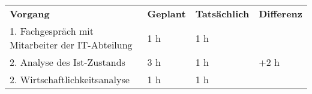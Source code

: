 \begin{tabularx}{\textwidth}{Xlll}
\rowcolor{heading}\textbf{Vorgang} & \textbf{Geplant} & \textbf{Tatsächlich} & \textbf{Differenz} \\
1. Fachgespräch mit Mitarbeiter der IT-Abteilung & 1 h   & 1 h   &  \\
\rowcolor{odd}2. Analyse des Ist-Zustands & 3 h   & 1 h   & +2 h \\
2. Wirtschaftlichkeitsanalyse & 1 h   & 1 h   &  \\
\end{tabularx}
